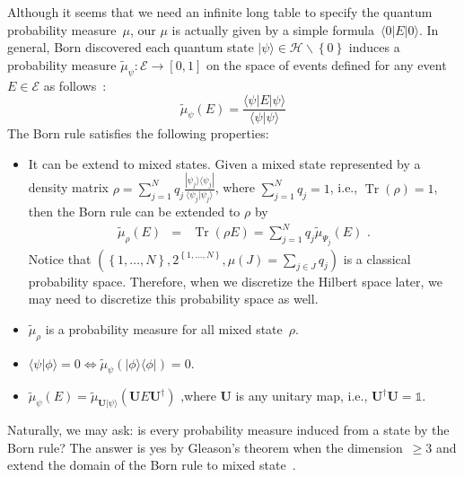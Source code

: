 \documentclass{article}
\theoremstyle{indented}
\newcommand{\qevents}{\ensuremath{\mathcal{E}}}
\newcommand{\pmeas}{\ensuremath{\mu}}
\newcommand{\Hilb}{\mathcal{H}}
\newcommand{\ket}[1]{|#1\rangle}
\newcommand{\ip}[2]{\langle #1 | #2 \rangle}
\newcommand{\proj}[1]{|#1 \rangle\langle #1 |}
\newcommand{\yutsung}[1]{\fbox{\begin{minipage}{0.9\textwidth}\color{purple}{Yu-Tsung says: #1}\end{minipage}}}
\newcommand{\melement}[2]{ \langle #1 | #2 | #1 \rangle}
\newcommand{\Tr}{\mathop{\mathrm{Tr}}\nolimits}
\begin{document}
Although it seems that we need an infinite long table to specify the
quantum probability measure~$\mu$, our $\mu$ is actually
given by a simple formula~$\melement{0}{E}$. In general, Born discovered
each quantum state $\ket{\psi}\in\Hilb\backslash\left\{ 0\right\} $
induces a probability measure $\tilde{\mu}_{\psi}:\qevents\rightarrow[0,1]$
on the space of events defined for any event $E\in\qevents$ as follows~\cite{Born1984,Mermin2007}:
\begin{equation}
\tilde{\mu}_{\psi}(E)=\frac{\melement{\psi}{E}}{\ip{\psi}{\psi}}\label{eq:Born}
\end{equation}
The Born rule satisfies the following properties:
\begin{itemize}
\item It can be extend to mixed states. Given a mixed state represented
by a density matrix $\rho=\sum_{j=1}^{N}q_{j}\frac{\proj{\psi_{j}}}{\ip{\psi_{j}}{\psi_{j}}}$,
where $\sum_{j=1}^{N}q_{j}=1$, i.e., $\Tr\left(\rho\right)=1$, then
the Born rule can be extended to $\rho$ by 
\begin{eqnarray}
\tilde{\mu}_{\rho}\left(E\right) & = & \Tr\left(\rho E\right)=\sum_{j=1}^{N}q_{j}\tilde{\mu}_{\Psi_{j}}\left(E\right)\textrm{ .}\label{BornRule.mixed}
\end{eqnarray}
Notice that $\left(\left\{ 1,\ldots,N\right\} ,2^{\left\{ 1,\ldots,N\right\} },\pmeas\left(J\right)=\sum_{j\in J}q_{j}\right)$
is a classical probability space. Therefore, when we discretize the
Hilbert space later, we may need to discretize this probability space
as well.\yutsung{Check!!!}
\item $\tilde{\mu}_{\rho}$ is a probability measure for all mixed state~$\rho$.
\item $\ip{\psi}{\phi}=0\Leftrightarrow\tilde{\mu}_{\psi}\left(\proj{\phi}\right)=0$.
\item $\tilde{\mu}_{\psi}\left(E\right)=\tilde{\mu}_{\mathbf{U}\ket{\psi}}\left(\mathbf{U}E\mathbf{U}^{\dagger}\right)\textrm{ ,}$where
$\mathbf{U}$ is any unitary map, i.e., $\mathbf{U}^{\dagger}\mathbf{U}=\mathbb{1}$. 
\end{itemize}
\yutsung{...I think I need to check these properties identify an
unique Born rule in CQT or something...}

Naturally, we may ask: is every probability measure induced from a
state by the Born rule? The answer is yes by Gleason's theorem when
the dimension~$\ge3$ and extend the domain of the Born rule to mixed
state~\cite{gleason1957,peres1995quantum,Redhead1987-REDINA}.
\end{document}

